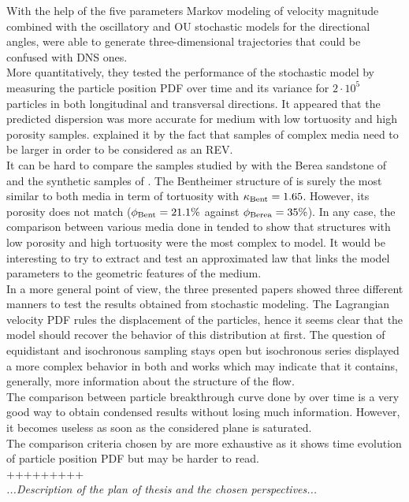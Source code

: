 With the help of the five parameters Markov modeling of velocity magnitude combined with the oscillatory and OU stochastic models for the directional angles, \citet{Meyer2016} were able to generate three-dimensional trajectories that could be confused with DNS ones. \\
More quantitatively, they tested the performance of the stochastic model by measuring the particle position PDF over time and its variance for $2\cdot10^5$ particles in both longitudinal and transversal directions.
It appeared that the predicted dispersion was more accurate for medium with low tortuosity and high porosity samples. 
\cite{Meyer2016} explained it by the fact that samples of complex media need to be larger in order to be considered as an REV.\\

It can be hard to compare the samples studied by \citeauthor{Meyer2016} with the Berea sandstone of \citet{Dentz2017} and the synthetic samples of \citet{Puyguiraud2019}. 
The Bentheimer structure of \citet{Meyer2016} is surely the most similar to both media in term of tortuosity with $\kappa_{\rm{Bent}}=1.65$. 
However, its porosity does not match ($\phi_{\rm{Bent}}=21.1\%$ against $\phi_{\rm{Berea}}=35\%$).
In any case, the comparison between various media done in \citet{Meyer2016} tended to show that structures with low porosity and high tortuosity were the most complex to model. 
It would be interesting to try to extract and test an approximated law that links the model parameters to the geometric features of the medium.\\

In a more general point of view, the three presented papers showed three different manners to test the results obtained from stochastic modeling. 
The Lagrangian velocity PDF rules the displacement of the particles, hence it seems clear that the model should recover the behavior of this distribution at first.
The question of equidistant and isochronous sampling stays open but isochronous series displayed a more complex behavior in both \citet{Meyer2016} and \citet{Puyguiraud2019} works which may indicate that it contains, generally, more information about the structure of the flow.\\
The comparison between particle breakthrough curve done by \citet{Dentz2017} over time is a very good way to obtain condensed results without losing much information. However, it becomes useless as soon as the considered plane is saturated.\\
The comparison criteria chosen by \citet{Meyer2016} are more exhaustive as it shows time evolution of particle position PDF but may be harder to read.\\
+++++++++\\
\textit{...Description of the plan of thesis and the chosen perspectives...}
